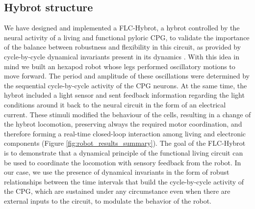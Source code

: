 \subsection{Hybrot structure}

We have designed and implemented a FLC-Hybrot, a hybrot controlled by the neural activity of a living and functional pyloric CPG, to validate the importance of the balance between robustness and flexibility in this circuit, as provided by cycle-by-cycle dynamical invariants present in its dynamics \cite{Elices2019}. With this idea in mind we built an hexapod robot whose legs performed oscillatory motions to move forward. The period and amplitude of these oscillations were determined by the sequential cycle-by-cycle activity of the CPG neurons. At the same time, the hybrot included a light sensor and sent feedback information regarding the light conditions around it back to the neural circuit in the form of an electrical current. These stimuli modified the behaviour of the cells, resulting in a change of the hybrot locomotion, preserving always the required motor coordination, and therefore forming a real-time closed-loop interaction among living and electronic components (Figure \ref{fig:robot_results_summary}). The goal of the FLC-Hybrot is to demonstrate that a dynamical principle of the functional living circuit can be used to coordinate the locomotion with sensory feedback from the robot. In our case, we use the presence of dynamical invariants in the form of robust relationships between the time intervals that build the cycle-by-cycle activity of the CPG, which are sustained under any circumstance even when there are external inputs to the circuit, to modulate the behavior of the robot. 

